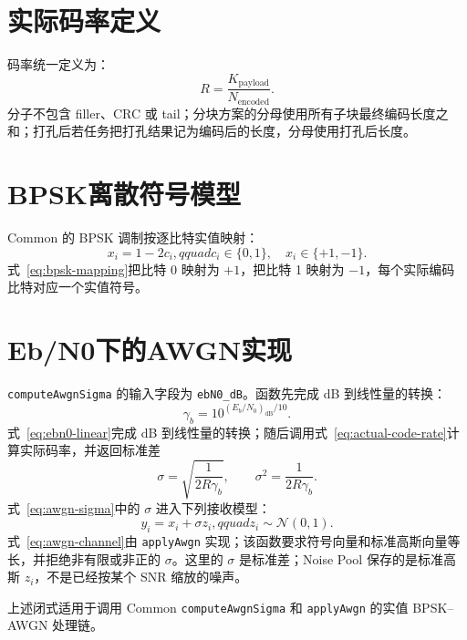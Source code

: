 \section{实际码率定义}

码率统一定义为：
\begin{equation}
  R=\frac{K_{\mathrm{payload}}}{N_{\mathrm{encoded}}}.
  \label{eq:actual-code-rate}
\end{equation}
分子不包含 filler、CRC 或 tail；分块方案的分母使用所有子块最终编码长度之和；打孔后若任务把打孔结果记为编码后的长度，分母使用打孔后长度。


\section{BPSK离散符号模型}

Common 的 BPSK 调制按逐比特实值映射：
\begin{equation}
  x_i=1-2c_i,qquad c_i\in\{0,1\},\quad x_i\in\{+1,-1\}.
  \label{eq:bpsk-mapping}
\end{equation}
式~\eqref{eq:bpsk-mapping}把比特 0 映射为 $+1$，把比特 1 映射为 $-1$，每个实际编码比特对应一个实值符号。

\section{Eb/N0下的AWGN实现}

\texttt{computeAwgnSigma} 的输入字段为 \texttt{ebN0\_dB}。函数先完成 dB 到线性量的转换：
\begin{equation}
  \gamma_b=10^{(E_b/N_0)_{\mathrm{dB}}/10}.
  \label{eq:ebn0-linear}
\end{equation}
式~\eqref{eq:ebn0-linear}完成 dB 到线性量的转换；随后调用式~\eqref{eq:actual-code-rate}计算实际码率，并返回标准差
\begin{equation}
  \sigma=\sqrt{\frac{1}{2R\gamma_b}},
  \qquad \sigma^2=\frac{1}{2R\gamma_b}.
  \label{eq:awgn-sigma}
\end{equation}
式~\eqref{eq:awgn-sigma}中的 $\sigma$ 进入下列接收模型：
\begin{equation}
  y_i=x_i+\sigma z_i,qquad z_i\sim\mathcal{N}(0,1).
  \label{eq:awgn-channel}
\end{equation}
式~\eqref{eq:awgn-channel}由 \texttt{applyAwgn} 实现；该函数要求符号向量和标准高斯向量等长，并拒绝非有限或非正的 $\sigma$。这里的 $\sigma$ 是标准差；Noise Pool 保存的是标准高斯 $z_i$，不是已经按某个 SNR 缩放的噪声。

上述闭式适用于调用 Common \texttt{computeAwgnSigma} 和 \texttt{applyAwgn} 的实值 BPSK--AWGN 处理链。


